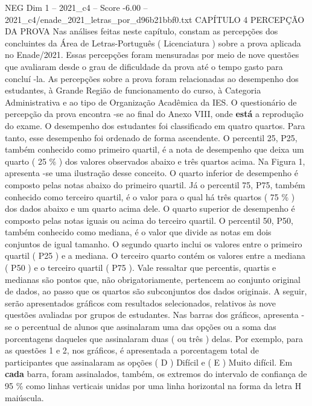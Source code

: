 \begin{textsample}{NEG Dim 1 – 2021\_c4 – Score -6.00 – 2021\_c4/enade\_2021\_letras\_por\_d96b21bbf0.txt}  \label{ex:f1_neg_061}
CAPÍTULO 4 PERCEPÇÃO DA PROVA Nas análises feitas neste capítulo, constam as percepções dos concluintes da Área de Letras-Português ( Licenciatura ) sobre a prova aplicada no Enade/2021.
Essas percepções foram mensuradas por meio de nove questões que avaliaram desde o grau de dificuldade da prova até o tempo gasto para concluí -la.
As percepções sobre a prova foram relacionadas ao desempenho dos estudantes, à Grande Região de funcionamento do curso, à Categoria Administrativa e ao tipo de Organização Acadêmica da IES.
O questionário de percepção da prova encontra -se ao final do Anexo VIII, onde \textbf{está} a reprodução do exame.
O desempenho dos estudantes foi classificado em quatro quartos.
Para tanto, esse desempenho foi ordenado de forma ascendente.
O percentil 25, P25, também conhecido como primeiro quartil, é a nota de desempenho que deixa um quarto ( 25 \% ) dos valores observados abaixo e três quartos acima.
Na Figura 1, apresenta -se uma ilustração desse conceito.
O quarto inferior de desempenho é composto pelas notas abaixo do primeiro quartil.
Já o percentil 75, P75, também conhecido como terceiro quartil, é o valor para o qual há três quartos ( 75 \% ) dos dados abaixo e um quarto acima dele.
O quarto superior de desempenho é composto pelas notas iguais ou acima do terceiro quartil.
O percentil 50, P50, também conhecido como mediana, é o valor que divide as notas em dois conjuntos de igual tamanho.
O segundo quarto inclui os valores entre o primeiro quartil ( P25 ) e a mediana.
O terceiro quarto contém os valores entre a mediana ( P50 ) e o terceiro quartil ( P75 ).
Vale ressaltar que percentis, quartis e medianas são pontos que, não obrigatoriamente, pertencem ao conjunto original de dados, ao passo que os quartos são subconjuntos dos dados originais.
A seguir, serão apresentados gráficos com resultados selecionados, relativos às nove questões avaliadas por grupos de estudantes.
Nas barras dos gráficos, apresenta -se o percentual de alunos que assinalaram uma das opções ou a soma das porcentagens daqueles que assinalaram duas ( ou três ) delas.
Por exemplo, para as questões 1 e 2, nos gráficos, é apresentada a porcentagem total de participantes que assinalaram as opções ( D ) Difícil e ( E ) Muito difícil.
Em \textbf{cada} barra, foram assinalados, também, os extremos do intervalo de confiança de 95 \% como linhas verticais unidas por uma linha horizontal na forma da letra H maiúscula.

\end{textsample}
